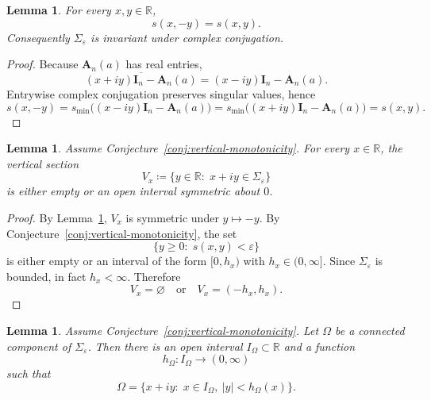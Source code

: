 \documentclass[11pt]{article}
\newtheorem{lemma}[theorem]{Lemma}
\begin{document}
\begin{lemma}\label{lem:conjugation-symmetry}
For every \(x,y\in\mathbb R\),
\[
s(x,-y)=s(x,y).
\]
Consequently \(\Sigma_\varepsilon\) is invariant under complex conjugation.
\end{lemma}

\begin{proof}
Because \(\mathbf A_n(a)\) has real entries,
\[
\overline{(x+iy)\mathbf I_n-\mathbf A_n(a)}
=
(x-iy)\mathbf I_n-\mathbf A_n(a).
\]
Entrywise complex conjugation preserves singular values, hence
\[
s(x,-y)
=
s_{\min}\!\bigl((x-iy)\mathbf I_n-\mathbf A_n(a)\bigr)
=
s_{\min}\!\bigl((x+iy)\mathbf I_n-\mathbf A_n(a)\bigr)
=
s(x,y).
\]
\end{proof}

\begin{lemma}\label{lem:vertical-sections}
Assume Conjecture~\ref{conj:vertical-monotonicity}. For every \(x\in\mathbb R\), the vertical section
\[
V_x
\coloneqq
\{y\in\mathbb R:\; x+iy\in\Sigma_\varepsilon\}
\]
is either empty or an open interval symmetric about \(0\).
\end{lemma}

\begin{proof}
By Lemma~\ref{lem:conjugation-symmetry}, \(V_x\) is symmetric under \(y\mapsto -y\). By Conjecture~\ref{conj:vertical-monotonicity}, the set
\[
\{y\ge 0:\; s(x,y)<\varepsilon\}
\]
is either empty or an interval of the form \([0,h_x)\) with \(h_x\in(0,\infty]\). Since \(\Sigma_\varepsilon\) is bounded, in fact \(h_x<\infty\). Therefore
\[
V_x=\varnothing
\quad\text{or}\quad
V_x=(-h_x,h_x).
\]
\end{proof}

\begin{lemma}\label{lem:component-fibers}
Assume Conjecture~\ref{conj:vertical-monotonicity}. Let \(\Omega\) be a connected component of \(\Sigma_\varepsilon\). Then there is an open interval \(I_\Omega\subset\mathbb R\) and a function
\[
h_\Omega:I_\Omega\to(0,\infty)
\]
such that
\[
\Omega
=
\{x+iy:\; x\in I_\Omega,\ |y|<h_\Omega(x)\}.
\]
\end{lemma}
\end{document}
